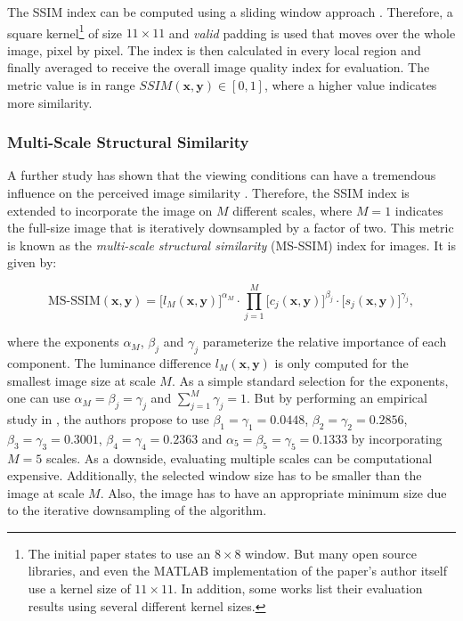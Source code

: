 The SSIM index can be computed using a sliding window approach \parencite{ssim-slide}. Therefore, a square kernel\footnote{The initial paper states to use an $ 8 \times 8 $ window. But many open source libraries, and even the MATLAB implementation of the paper's author itself use a kernel size of $ 11 \times 11 $. In addition, some works list their evaluation results using several different kernel sizes.} of size $ 11 \times 11 $ and \textit{valid} padding is used that moves over the whole image, pixel by pixel. The index is then calculated in every local region and finally averaged to receive the overall image quality index for evaluation. The metric value is in range $ SSIM(\textbf{x}, \textbf{y}) \in [0, 1] $, where a higher value indicates more similarity.

\subsubsection*{Multi-Scale Structural Similarity}

A further study has shown that the viewing conditions can have a tremendous influence on the perceived image similarity \parencite{ms-ssim}. Therefore, the SSIM index is extended to incorporate the image on $ M $ different scales, where $ M=1 $ indicates the full-size image that is iteratively downsampled by a factor of two. This metric is known as the \textit{multi-scale structural similarity} (MS-SSIM) index for images. It is given by:

\begin{equation} \label{eq:ms-ssim}
\textrm{MS-SSIM}(\textbf{x}, \textbf{y}) = \big[ l_M(\textbf{x}, \textbf{y})\big]^{\alpha_M} \cdot \prod\limits_{j=1}^{M} \big[c_j(\textbf{x}, \textbf{y}) \big]^{\beta_j} \cdot \big[ s_j(\textbf{x}, \textbf{y}) \big]^{\gamma_j} ,
\end{equation}

where the exponents $ \alpha_M $, $ \beta_j $ and $ \gamma_j $ parameterize the relative importance of each component. The luminance difference $ l_M(\textbf{x}, \textbf{y}) $ is only computed for the smallest image size at scale $ M $. As a simple standard selection for the exponents, one can use $ \alpha_M = \beta_j = \gamma_j $ and $ \sum_{j=1}^{M} \gamma_j = 1 $. But by performing an empirical study in \parencite{ms-ssim}, the authors propose to use $ \beta_1 = \gamma_1 = 0.0448 $, $ \beta_2 = \gamma_2 = 0.2856 $, $ \beta_3 = \gamma_3 = 0.3001 $, $ \beta_4 = \gamma_4 = 0.2363 $ and $ \alpha_5 = \beta_5 = \gamma_5 = 0.1333 $ by incorporating $ M=5 $ scales. As a downside, evaluating multiple scales can be computational expensive. Additionally, the selected window size has to be smaller than the image at scale $ M $. Also, the image has to have an appropriate minimum size due to the iterative downsampling of the algorithm.


